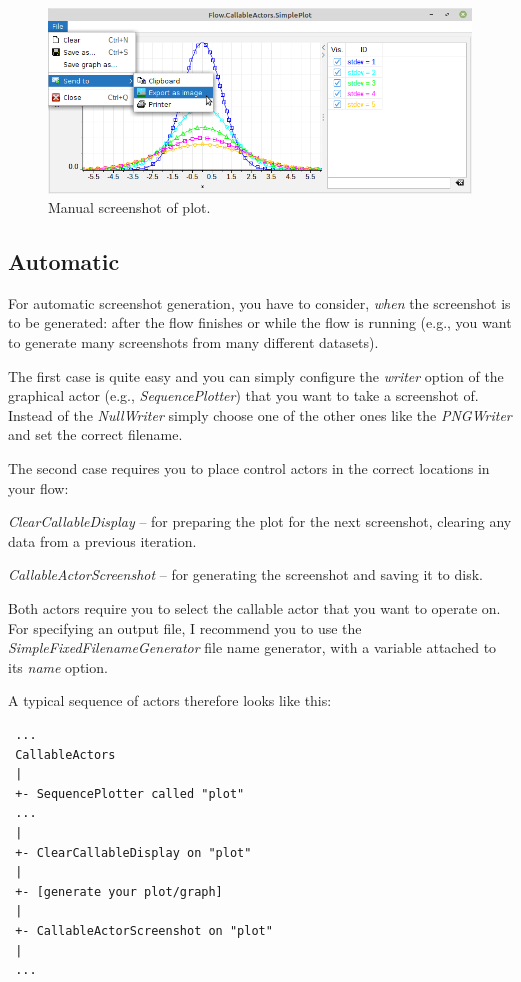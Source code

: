 \begin{figure}[htb]
  \centering
  \includegraphics[width=12.0cm]{images/screenshots_manual.png}
  \caption{Manual screenshot of plot.}
  \label{screenshots_manual}
\end{figure}

\subsection{Automatic}
For automatic screenshot generation, you have to consider, \textit{when} the
screenshot is to be generated: after the flow finishes or while the flow is
running (e.g., you want to generate many screenshots from many different
datasets).

The first case is quite easy and you can simply configure the \textit{writer}
option of the graphical actor (e.g., \textit{SequencePlotter}) that you want
to take a screenshot of. Instead of the \textit{NullWriter} simply choose one
of the other ones like the \textit{PNGWriter} and set the correct filename.

The second case requires you to place control actors in the correct locations
in your flow:
\begin{tight_itemize}
  \item \textit{ClearCallableDisplay} -- for preparing the plot for the next
  screenshot, clearing any data from a previous iteration.
  \item \textit{CallableActorScreenshot} -- for generating the screenshot
  and saving it to disk.
\end{tight_itemize}

Both actors require you to select the callable actor that you want to operate
on. For specifying an output file, I recommend you to use the
\textit{SimpleFixedFilenameGenerator} file name generator, with a variable
attached to its \textit{name} option.

A typical sequence of actors therefore looks like this:
\begin{verbatim}
 ...
 CallableActors
 |
 +- SequencePlotter called "plot"
 ...
 |
 +- ClearCallableDisplay on "plot"
 |
 +- [generate your plot/graph]
 |
 +- CallableActorScreenshot on "plot"
 |
 ...
\end{verbatim}

